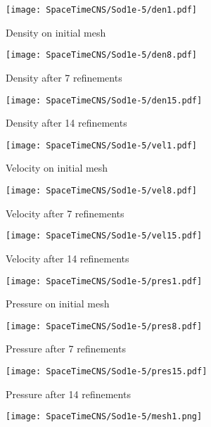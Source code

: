 \documentclass[Dissertation.tex]{subfiles}
\begin{document}
\begin{figure}[p]
\centering
\begin{subfigure}[c]{0.3\textwidth}
\centering
\texttt{[image: SpaceTimeCNS/Sod1e-5/den1.pdf]}
\caption{Density on initial mesh}
\label{fig:sod_den0}
\end{subfigure}
\begin{subfigure}[c]{0.3\textwidth}
\centering
\texttt{[image: SpaceTimeCNS/Sod1e-5/den8.pdf]}
\caption{Density after 7 refinements}
\label{fig:sod_den7}
\end{subfigure}
\begin{subfigure}[c]{0.3\textwidth}
\centering
\texttt{[image: SpaceTimeCNS/Sod1e-5/den15.pdf]}
\caption{Density after 14 refinements}
\label{fig:sod_den14}
\end{subfigure}
\begin{subfigure}[c]{0.3\textwidth}
\centering
\texttt{[image: SpaceTimeCNS/Sod1e-5/vel1.pdf]}
\caption{Velocity on initial mesh}
\label{fig:sod_vel0}
\end{subfigure}
\begin{subfigure}[c]{0.3\textwidth}
\centering
\texttt{[image: SpaceTimeCNS/Sod1e-5/vel8.pdf]}
\caption{Velocity after 7 refinements}
\label{fig:sod_vel7}
\end{subfigure}
\begin{subfigure}[c]{0.3\textwidth}
\centering
\texttt{[image: SpaceTimeCNS/Sod1e-5/vel15.pdf]}
\caption{Velocity after 14 refinements}
\label{fig:sod_vel14}
\end{subfigure}
\begin{subfigure}[c]{0.3\textwidth}
\centering
\texttt{[image: SpaceTimeCNS/Sod1e-5/pres1.pdf]}
\caption{Pressure on initial mesh}
\label{fig:sod_pres0}
\end{subfigure}
\begin{subfigure}[c]{0.3\textwidth}
\centering
\texttt{[image: SpaceTimeCNS/Sod1e-5/pres8.pdf]}
\caption{Pressure after 7 refinements}
\label{fig:sod_pres7}
\end{subfigure}
\begin{subfigure}[c]{0.3\textwidth}
\centering
\texttt{[image: SpaceTimeCNS/Sod1e-5/pres15.pdf]}
\caption{Pressure after 14 refinements}
\label{fig:sod_pres14}
\end{subfigure}
\begin{subfigure}[c]{0.45\textwidth}
\centering
\texttt{[image: SpaceTimeCNS/Sod1e-5/mesh1.png]}

\end{subfigure}
\end{figure}
\end{document}

